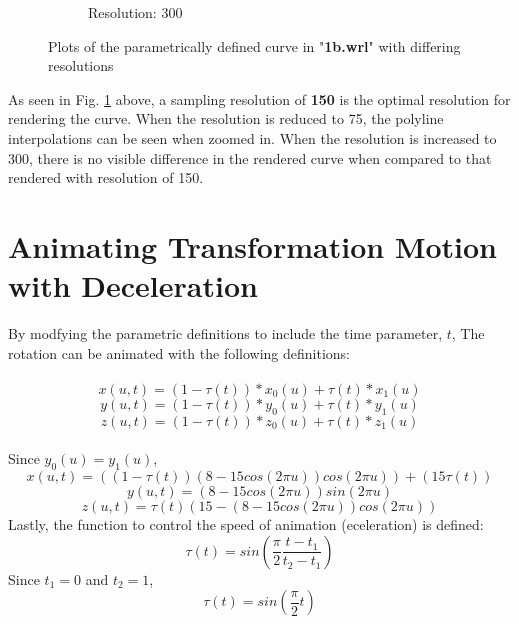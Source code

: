 \documentclass[acmlarge,nonacm=true]{acmart}
\begin{document}
\begin{figure}[H]
\begin{subfigure}{.33\textwidth}
			\caption{Resolution: 300}
	\end{subfigure}
	\caption{Plots of the parametrically defined curve in "\textbf{1b.wrl}" with differing resolutions}
	\label{fig:1b}
\end{figure}
As seen in Fig. \ref{fig:1b} above, a sampling resolution of \textbf{150} is the optimal 
resolution for rendering the curve. When the resolution is reduced to 75, the polyline interpolations can 
be seen when zoomed in. When the resolution is increased to 300, there is no visible difference 
in the rendered curve when compared to that rendered with resolution of 150.

\newpage
\section{Animating Transformation Motion with Deceleration}
By modfying the parametric definitions to include the time parameter, $t$,
The rotation can be animated with the following definitions:\\\\
\begin{displaymath}
	x(u,t) =  (1-\tau(t))*x_0(u) + \tau(t)*x_1(u)
\end{displaymath}
\begin{displaymath}
	y(u,t) =  (1-\tau(t))*y_0(u) + \tau(t)*y_1(u)
\end{displaymath}
\begin{displaymath}
	z(u,t) =  (1-\tau(t))*z_0(u) + \tau(t)*z_1(u)
\end{displaymath}\\
Since $y_0(u) = y_1(u)$,\\
\begin{displaymath}
	x(u,t) =  ((1-\tau(t))(8 - 15cos(2\pi u))cos(2\pi u)) + (15\tau(t))
\end{displaymath}
\begin{displaymath}
	y(u,t) =  (8 - 15cos(2\pi u))sin(2\pi u)
\end{displaymath}
\begin{displaymath}
	z(u,t) =  \tau(t)(15 - (8 - 15cos(2\pi u))cos(2\pi u))
\end{displaymath}
Lastly, the function to control the speed of animation (eceleration) is defined:\\
\begin{displaymath}
	\tau(t) =  sin(\frac{\pi}{2} \frac{t-t_1}{t_2-t_1})
\end{displaymath}
Since $t_1 = 0$ and $t_2 = 1$,
\begin{displaymath}
	\tau(t) =  sin(\frac{\pi}{2}t)
\end{displaymath}
\end{document}
